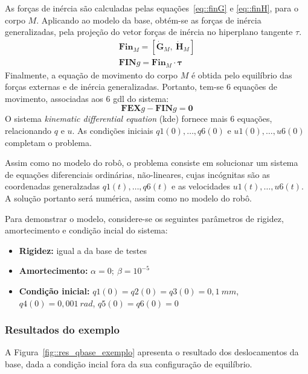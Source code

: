 As forças de inércia são calculadas pelas equações~\ref{eq::finG} e
\ref{eq::finH}, para o corpo $M$. Aplicando ao modelo da base, obtém-se as
forças de inércia generalizadas, pela projeção do vetor forças de inércia no
hiperplano tangente $\tau$.
%
\begin{gather}
	\mathbf{Fin}_M = [\dot{\mathbf{G}}_{M},~ \dot{\mathbf{H}}_{M}] \\
	\mathbf{FIN}g = \mathbf{Fin}_M \cdot \boldsymbol{\tau}
\end{gather}
%
Finalmente, a equação de movimento do corpo $M$ é obtida pelo equilíbrio das
forças externas e de inércia generalizadas. Portanto, tem-se 6 equações de
movimento, associadas aos 6 gdl do sistema:
%
\begin{equation}
	\mathbf{FEX}g - \mathbf{FIN}g = \mathbf{0}
\end{equation}
%
O sistema \textit{kinematic differential equation} (kde) fornece mais 6
equações, relacionando $q$ e $u$. As condições iniciais $q1(0),\ldots,q6(0)$ e
$u1(0),\ldots,u6(0)$ completam o problema.

Assim como no modelo do robô, o problema consiste em solucionar um sistema de
equações diferenciais ordinárias, não-lineares, cujas incógnitas são as
coordenadas generalzadas $q1(t),\ldots,q6(t)$ e as velocidades
$u1(t),\ldots,u6(t)$. A solução portanto será numérica, assim como no modelo do
robô.

Para demonstrar o modelo, considere-se os seguintes parâmetros de rigidez,
amortecimento e condição incial do sistema:
%
\begin{itemize}
  \item{\textbf{Rigidez:} igual a da base de testes}
  \item{\textbf{Amortecimento:} $\alpha = 0;~ \beta = 10^{-5}$}
  \item{\textbf{Condição inicial:} $q1(0) = q2(0) = q3(0) = 0,1~mm$, $q4(0) =
  0,001~rad$, $q5(0) = q6(0) = 0$}
\end{itemize}
%


\subsubsection{Resultados do exemplo}

A Figura~\ref{fig::res_qbase_exemplo} apresenta o resultado dos deslocamentos da
base, dada a condição incial fora da sua configuração de equilíbrio.

